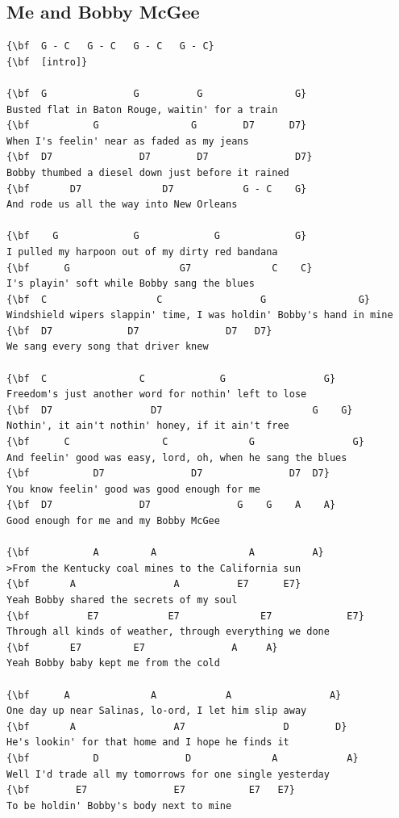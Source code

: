 \documentclass[a4paper]{article}
\begin{document}
\subsection{Me and Bobby McGee}
\begin{Verbatim}[commandchars=\\\{\}]
{\bf  G - C   G - C   G - C   G - C}
{\bf  [intro]}

{\bf  G               G          G                G}
Busted flat in Baton Rouge, waitin' for a train
{\bf           G                G        D7      D7}
When I's feelin' near as faded as my jeans
{\bf  D7               D7        D7               D7}
Bobby thumbed a diesel down just before it rained
{\bf       D7              D7            G - C    G}
And rode us all the way into New Orleans

{\bf    G             G             G             G}
I pulled my harpoon out of my dirty red bandana
{\bf      G                   G7              C    C}
I's playin' soft while Bobby sang the blues
{\bf  C                   C                 G                G}
Windshield wipers slappin' time, I was holdin' Bobby's hand in mine
{\bf  D7             D7               D7   D7}
We sang every song that driver knew

{\bf  C                C             G                 G}
Freedom's just another word for nothin' left to lose
{\bf  D7                 D7                          G    G}
Nothin', it ain't nothin' honey, if it ain't free
{\bf      C                C              G                 G}
And feelin' good was easy, lord, oh, when he sang the blues
{\bf           D7               D7               D7  D7}
You know feelin' good was good enough for me
{\bf  D7               D7               G    G    A    A}
Good enough for me and my Bobby McGee

{\bf           A         A                A          A}
>From the Kentucky coal mines to the California sun
{\bf       A                 A          E7      E7}
Yeah Bobby shared the secrets of my soul
{\bf          E7            E7              E7             E7}
Through all kinds of weather, through everything we done
{\bf       E7         E7               A     A}
Yeah Bobby baby kept me from the cold

{\bf      A              A            A                 A}
One day up near Salinas, lo-ord, I let him slip away
{\bf       A                 A7                 D        D}
He's lookin' for that home and I hope he finds it
{\bf           D               D              A            A}
Well I'd trade all my tomorrows for one single yesterday
{\bf        E7               E7           E7   E7}
To be holdin' Bobby's body next to mine


\end{Verbatim}
\end{document}
